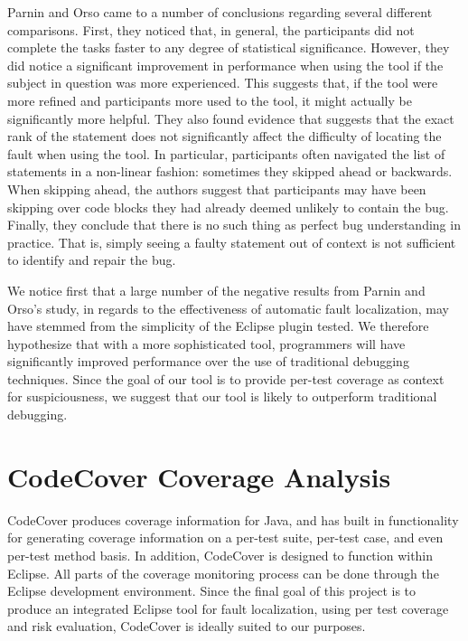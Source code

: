 Parnin and Orso came to a number of conclusions regarding several different
comparisons.  First, they noticed that, in general, the participants did not
complete the tasks faster to any degree of statistical significance.  However,
they did notice a significant improvement in performance when using the tool
if the subject in question was more experienced.  This suggests that, if the
tool were more refined and participants more used to the tool, it might actually
be significantly more helpful.  They also found evidence that suggests that the
exact rank of the statement does not significantly affect the difficulty of
locating the fault when using the tool.  In particular, participants often 
navigated the list of statements in a non-linear fashion: sometimes they skipped
ahead or backwards.  When skipping ahead, the authors suggest that participants
may have been skipping over code blocks they had already deemed unlikely to contain
the bug.  Finally, they conclude that there is no such thing as perfect bug 
understanding in practice.  That is, simply seeing a faulty statement out of 
context is not sufficient to identify and repair the bug.

We notice first that a large number of the negative results from Parnin and Orso's
study, in regards to the effectiveness of automatic fault localization, may have
stemmed from the simplicity of the Eclipse plugin tested.  We therefore hypothesize
that with a more sophisticated tool, programmers will have significantly improved
performance over the use of traditional debugging techniques.  Since the goal of our
tool is to provide per-test coverage as context for suspiciousness, we suggest that
our tool is likely to outperform traditional debugging.

\section{CodeCover Coverage Analysis}\label{sec:cover}
CodeCover produces coverage information for Java, and has built in 
functionality for generating coverage information on a per-test suite,
per-test case, and even per-test method basis.  In addition, CodeCover
is designed to function within Eclipse.  All parts of the coverage
monitoring process can be done through the Eclipse development
environment.  Since the final goal of this project is to produce an
integrated Eclipse tool for fault localization, using per test
coverage and risk evaluation, CodeCover is ideally suited to our
purposes.  

